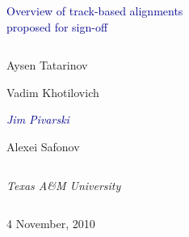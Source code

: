 \documentclass[compress]{beamer}
\begin{document}
\begin{frame}
\vfill
\begin{center}
\textcolor{darkblue}{\Large Overview of track-based alignments \\ \vspace{0.2 cm} proposed for sign-off}

\vfill
\begin{columns}
\begin{center}
\large
Aysen Tatarinov

Vadim Khotilovich

\textcolor{darkblue}{\it Jim Pivarski}

Alexei Safonov
\end{center}
\end{columns}

\begin{columns}
\begin{center}
\scriptsize
{\it Texas A\&M University}
\end{center}
\end{columns}

\vfill
 4 November, 2010

\end{center}
\end{frame}


\small
\end{document}

